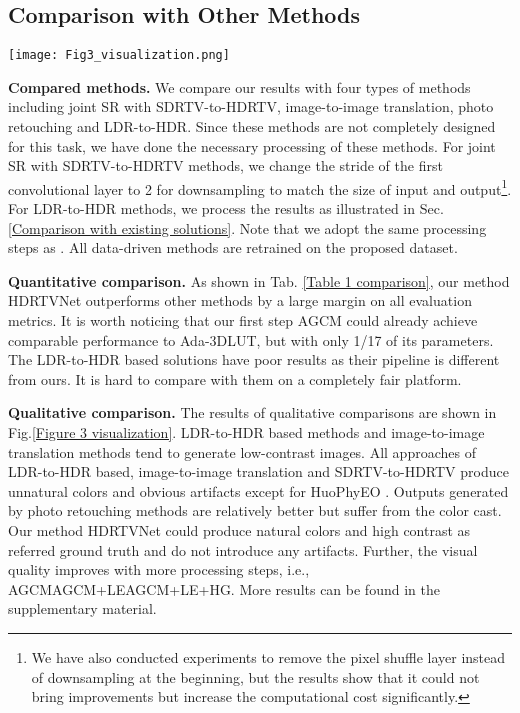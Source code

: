 \documentclass[10pt,twocolumn,letterpaper]{article}
\begin{document}
\subsection{Comparison with Other Methods}

\begin{figure*}[!t]
   \begin{center}
\texttt{[image: Fig3\_visualization.png]}
   \end{center}
   \vspace{-10pt}
      \caption{Qualitative comparisons. The top row describes the categories of algorithms.}
   \label{Figure 3 visualization}
   \end{figure*}

\textbf{Compared methods.} 
We compare our results with four types of methods including joint SR with SDRTV-to-HDRTV, image-to-image translation, photo retouching and LDR-to-HDR. Since these methods are not completely designed for this task, we have done the necessary processing of these methods. For joint SR with SDRTV-to-HDRTV methods, we change the stride of the first convolutional layer to 2 for downsampling to match the size of input and output\footnote{We have also conducted experiments to remove the pixel shuffle layer instead of downsampling at the beginning, but the results show that it could not bring improvements but increase the computational cost significantly.}. For LDR-to-HDR methods, we process the results as illustrated in Sec. \ref{Comparison with existing solutions}. Note that we adopt the same processing steps as \cite{kim2019deep, kim2020jsi}. All data-driven methods are retrained on the proposed dataset. 

\textbf{Quantitative comparison.} As shown in Tab. \ref{Table 1 comparison}, our method HDRTVNet outperforms other methods by a large margin on all evaluation metrics. It is worth noticing that our first step AGCM could already achieve comparable performance to Ada-3DLUT, but with only 1/17 of its parameters. The LDR-to-HDR based solutions have poor results as their pipeline is different from ours. It is hard to compare with them on a completely fair platform.

\textbf{Qualitative comparison.} The results of qualitative comparisons are shown in Fig.\ref{Figure 3 visualization}. LDR-to-HDR based methods and image-to-image translation methods tend to generate low-contrast images. All approaches of LDR-to-HDR based, image-to-image translation and SDRTV-to-HDRTV produce unnatural colors and obvious artifacts except for HuoPhyEO \cite{huo2014physiological}. Outputs generated by photo retouching methods are relatively better but suffer from the color cast. Our method HDRTVNet could produce natural colors and high contrast as referred ground truth and do not introduce any artifacts. Further, the visual quality improves with more processing steps, i.e., AGCMAGCM+LEAGCM+LE+HG. More results can be found in the supplementary material.
\end{document}
